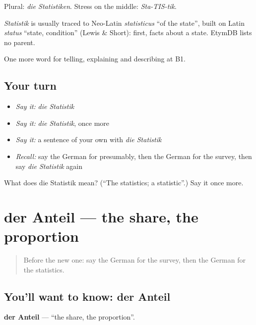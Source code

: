 Plural: \emph{die Statistiken}. Stress on the middle: \emph{Sta-TIS-tik}.

\begin{cousinweb}
\emph{Statistik} is usually traced to Neo-Latin \emph{statisticus} \textquotedblleft{}of the state\textquotedblright{}, built on Latin \emph{status} \textquotedblleft{}state, condition\textquotedblright{} (Lewis \& Short): first, facts about a state. EtymDB lists no parent.
\end{cousinweb}

\begin{grammarlens}[title={What you've built}]
One more word for telling, explaining and describing at B1.
\end{grammarlens}

\subsection*{Your turn}
\begin{itemize}
\raggedright
  \item \emph{Say it:} \emph{die Statistik}
  \item \emph{Say it:} \emph{die Statistik}, once more
  \item \emph{Say it:} a sentence of your own with \emph{die Statistik}
  \item \emph{Recall:} say the German for presumably, then the German for the survey, then say \emph{die Statistik} again
\end{itemize}

\begin{tcolorbox}[breakable,colback=teal!4,colframe=teal!35!black,title={Before you move on}]
What does die Statistik mean? (\textquotedblleft{}The statistics; a statistic\textquotedblright{}.) Say it once more.
\end{tcolorbox}
\section[der Anteil]{der Anteil — the share, the proportion}

\label{lesson:GE-C276-anteil}



\begin{quote}
Before the new one: say the German for the survey, then the German for the statistics.
\end{quote}

\subsection*{You'll want to know: der Anteil}
\textbf{der Anteil} — \textquotedblleft{}the share, the proportion\textquotedblright{}.

